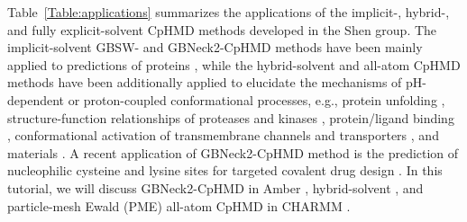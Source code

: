 Table~\ref{Table:applications} summarizes the applications of the implicit-, hybrid-, and fully explicit-solvent CpHMD methods developed in the Shen group.
The implicit-solvent GBSW- and GBNeck2-CpHMD methods have been mainly applied to {\pka} predictions of proteins
\cite{Khandogin_Brooks_2006_Biochemistry,Wallace_Shen_2009_MethodsEnzymol.,Wallace_Shen_2011_Proteins,Harris_Shen_2019_J.Chem.Inf.Model.,Harris_Shen_2020_J.Chem.TheoryComput.},
while the hybrid-solvent and all-atom CpHMD methods have been additionally applied to elucidate the mechanisms of pH-dependent or proton-coupled conformational processes, e.g.,
protein unfolding
\cite{Yue_Shen_2018_Phys.Chem.Chem.Phys.},
structure-function relationships of proteases and kinases \cite{Ellis_Shen_2015_J.Am.Chem.Soc.,Tsai_Shen_2019_J.Am.Chem.Soc.,Ma_Shen_2021_J.Chem.Inf.Model.,Verma_Shen_2020_J.Am.Chem.Soc.,Henderson_Shen_2020_J.Chem.Phys.}, protein/ligand binding \cite{Ellis_Shen_2016_J.Phys.Chem.Lett.,Harris_Shen_2017_J.Phys.Chem.Lett.,Henderson_Shen_2018_J.Phys.Chem.Lett.}, 
conformational activation of transmembrane channels and transporters \cite{Chen_Shen_2016_J.Phys.Chem.Lett.,Yue_Shen_2017_J.Chem.TheoryComput.,Huang_Shen_2016_Nat.Commun.},
and materials \cite{Morrow_Shen_2015_J.Am.Chem.Soc.,Tsai_Shen_2018_Chem.Mater.}.
A recent application of GBNeck2-CpHMD method is the prediction of nucleophilic cysteine and lysine sites for targeted covalent drug design \cite{Liu_Shen_2019_J.Am.Chem.Soc.,Verma_Shen_2020_J.Am.Chem.Soc.,Henderson_Shen_2020_J.Chem.Phys.,Liu_Shen_2021_J.Med.Chem.a,Liu_Shen_2021_RSCMed.Chem.}. 
In this tutorial, we will discuss GBNeck2-CpHMD in Amber \cite{Huang_Shen_2018_J.Phys.Chem.Lett.,Harris_Shen_2019_J.Chem.Inf.Model.},
hybrid-solvent  \cite{Wallace_Shen_2011_J.Chem.TheoryComput.},
and particle-mesh Ewald (PME) all-atom CpHMD 
\cite{Huang_Shen_2016_J.Chem.TheoryComput.}
in CHARMM \cite{Brooks_Karplus_2009_J.Comput.Chem.}. 

